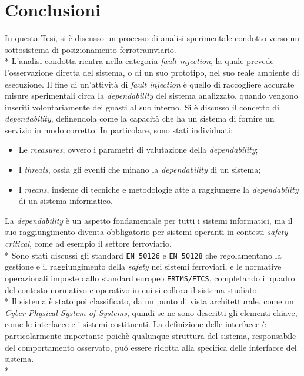 \chapter{Conclusioni}
In questa Tesi, si \`e discusso un processo di analisi sperimentale condotto verso un sottosistema di posizionamento ferrotramviario.\\*
L'analisi condotta rientra nella categoria \emph{fault injection}, la quale prevede l'osservazione diretta del sistema, o di un suo prototipo, nel suo reale ambiente di esecuzione. Il fine di un'attivit\`a di \emph{fault injection} \`e quello di raccogliere accurate misure sperimentali circa la \emph{dependability} del sistema analizzato, quando vengono inseriti volontariamente dei guasti al suo interno. Si \`e discusso il concetto di \emph{dependability}, definendola come la capacit\`a che ha un sistema di fornire un servizio in modo corretto. In particolare, sono stati individuati:
\begin{itemize}
	\item Le \emph{measures}, ovvero i parametri di valutazione della \emph{dependability};
	\item I \emph{threats}, ossia gli eventi che minano la \emph{dependability} di un sistema;
	\item I \emph{means}, insieme di tecniche e metodologie atte a raggiungere la \emph{dependability} di un sistema informatico.
\end{itemize}
La \emph{dependability} \`e un aspetto fondamentale per tutti i sistemi informatici, ma il suo raggiungimento diventa obbligatorio per sistemi operanti in contesti \emph{safety critical}, come ad esempio il settore ferroviario.\\*
Sono stati discussi gli standard \texttt{EN 50126} e \texttt{EN 50128} che regolamentano la gestione e il raggiungimento della \emph{safety} nei sistemi ferroviari, e le normative operazionali imposte dallo standard europeo \texttt{ERTMS/ETCS}, completando il quadro del contesto normativo e operativo in cui si colloca il sistema studiato.\\*
Il sistema \`e stato poi classificato, da un punto di vista architetturale, come un \emph{Cyber Physical System of Systems}, quindi se ne sono descritti gli elementi chiave, come le interfacce e i sistemi costituenti. La definizione delle interfacce \`e particolarmente importante poich\`e qualunque struttura del sistema, responsabile del comportamento osservato, pu\'o essere ridotta alla specifica delle interfacce del sistema.\\*
